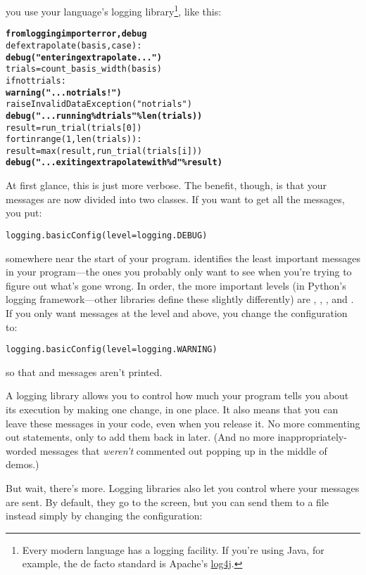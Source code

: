 \documentclass{report}
\begin{document}
you use your language's logging library\footnote{Every modern language
has a logging facility.  If you're using Java, for example, the de
facto standard is Apache's \url{log4j}.}, like this:

\begin{alltt}
\textbf{from logging import error, debug}
def extrapolate(basis, case):
    \textbf{debug("entering extrapolate...")}
    trials = count_basis_width(basis)
    if not trials:
        \textbf{warning("...no trials!")}
        raise InvalidDataException("no trials")
    \textbf{debug("...running \%d trials" \% len(trials))}
    result = run_trial(trials[0])
    for t in range(1, len(trials)):
        result = max(result, run_trial(trials[i]))
    \textbf{debug("...exiting extrapolate with \%d" \% result)}
\end{alltt}

At first glance, this is just more verbose.  The benefit, though, is
that your messages are now divided into two classes.  If you want to
get all the messages, you put:

\begin{alltt}
logging.basicConfig(level=logging.DEBUG)
\end{alltt}

somewhere near the start of your program.   identifies the
least important messages in your program---the ones you probably only
want to see when you're trying to figure out what's gone wrong.  In
order, the more important levels (in Python's logging
framework---other libraries define these slightly differently) are
, , , and .  If
you only want messages at the  level and above, you
change the configuration to:

\begin{alltt}
logging.basicConfig(level=logging.WARNING)
\end{alltt}

so that  and  messages aren't printed.

A logging library allows you to control how much your program tells
you about its execution by making one change, in one place.  It also
means that you can leave these messages in your code, even when you
release it.  No more commenting out  statements, only to
add them back in later.  (And no more inappropriately-worded messages
that \emph{weren't} commented out popping up in the middle of demos.)

But wait, there's more.  Logging libraries also let you control where
your messages are sent.  By default, they go to the screen, but you
can send them to a file instead simply by changing the configuration:
\end{document}
